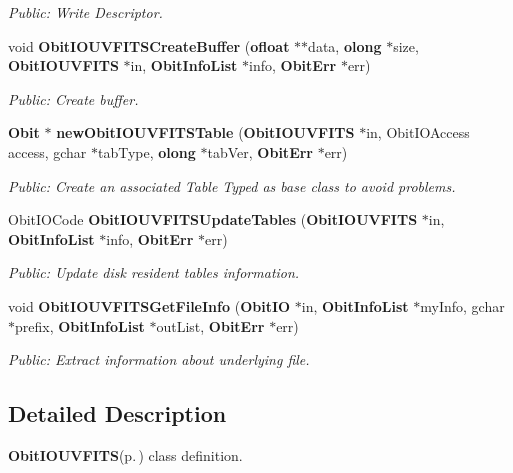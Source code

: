 \begin{CompactItemize}
\begin{CompactList}\small\item\em Public: Write Descriptor. \item\end{CompactList}\item 
void {\bf Obit\-IOUVFITSCreate\-Buffer} ({\bf ofloat} $\ast$$\ast$data, {\bf olong} $\ast$size, {\bf Obit\-IOUVFITS} $\ast$in, {\bf Obit\-Info\-List} $\ast$info, {\bf Obit\-Err} $\ast$err)
\begin{CompactList}\small\item\em Public: Create buffer. \item\end{CompactList}\item 
{\bf Obit} $\ast$ {\bf new\-Obit\-IOUVFITSTable} ({\bf Obit\-IOUVFITS} $\ast$in, Obit\-IOAccess access, gchar $\ast$tab\-Type, {\bf olong} $\ast$tab\-Ver, {\bf Obit\-Err} $\ast$err)
\begin{CompactList}\small\item\em Public: Create an associated Table Typed as base class to avoid problems. \item\end{CompactList}\item 
Obit\-IOCode {\bf Obit\-IOUVFITSUpdate\-Tables} ({\bf Obit\-IOUVFITS} $\ast$in, {\bf Obit\-Info\-List} $\ast$info, {\bf Obit\-Err} $\ast$err)
\begin{CompactList}\small\item\em Public: Update disk resident tables information. \item\end{CompactList}\item 
void {\bf Obit\-IOUVFITSGet\-File\-Info} ({\bf Obit\-IO} $\ast$in, {\bf Obit\-Info\-List} $\ast$my\-Info, gchar $\ast$prefix, {\bf Obit\-Info\-List} $\ast$out\-List, {\bf Obit\-Err} $\ast$err)
\begin{CompactList}\small\item\em Public: Extract information about underlying file. \item\end{CompactList}\end{CompactItemize}


\subsection{Detailed Description}
{\bf Obit\-IOUVFITS}{\rm (p.\,\pageref{structObitIOUVFITS})} class definition. 

